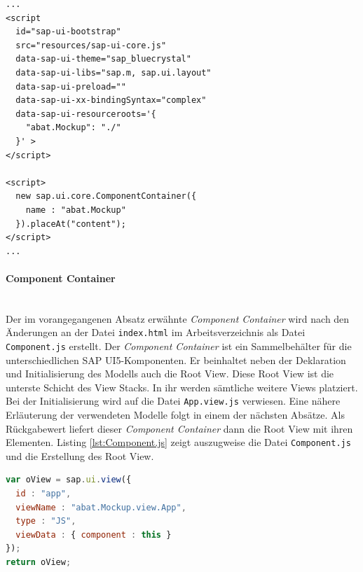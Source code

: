 \vspace{2em}
\begin{lstlisting}[language=HTML5, caption=Bootstrapping der SAP UI5-Applikation, label=lst:bootstrapping]
...
<script
  id="sap-ui-bootstrap"
  src="resources/sap-ui-core.js"
  data-sap-ui-theme="sap_bluecrystal"
  data-sap-ui-libs="sap.m, sap.ui.layout"
  data-sap-ui-preload="" 
  data-sap-ui-xx-bindingSyntax="complex"
  data-sap-ui-resourceroots='{
    "abat.Mockup": "./"
  }' >
</script>

<script>
  new sap.ui.core.ComponentContainer({
    name : "abat.Mockup"
  }).placeAt("content");
</script>
...
\end{lstlisting}
	
\paragraph{Component Container}$\;$ \\
Der im vorangegangenen Absatz erwähnte \textit{Component Container} wird nach den Änderungen an der Datei \texttt{index.html} im Arbeitsverzeichnis als Datei \texttt{Component.js} erstellt. Der \textit{Component Container} ist ein Sammelbehälter für die unterschiedlichen SAP UI5-Komponenten. Er beinhaltet neben der Deklaration und Initialisierung des Modells auch die Root View. Diese Root View ist die unterste Schicht des View Stacks. In ihr werden sämtliche weitere Views platziert. Bei der Initialisierung wird auf die Datei \texttt{App.view.js} verwiesen. Eine nähere Erläuterung der verwendeten Modelle folgt in einem der nächsten Absätze. Als Rückgabewert liefert dieser \textit{Component Container} dann die Root View mit ihren Elementen. Listing \ref{lst:Component.js} zeigt auszugweise die Datei \texttt{Component.js} und die Erstellung des Root View.

\vspace{1em}
\begin{lstlisting}[language=JavaScript, caption=Auszug aus der Datei \texttt{Component.js}, label=lst:Component.js]
var oView = sap.ui.view({
  id : "app",
  viewName : "abat.Mockup.view.App",
  type : "JS",
  viewData : { component : this }
});
return oView;
\end{lstlisting}
	
